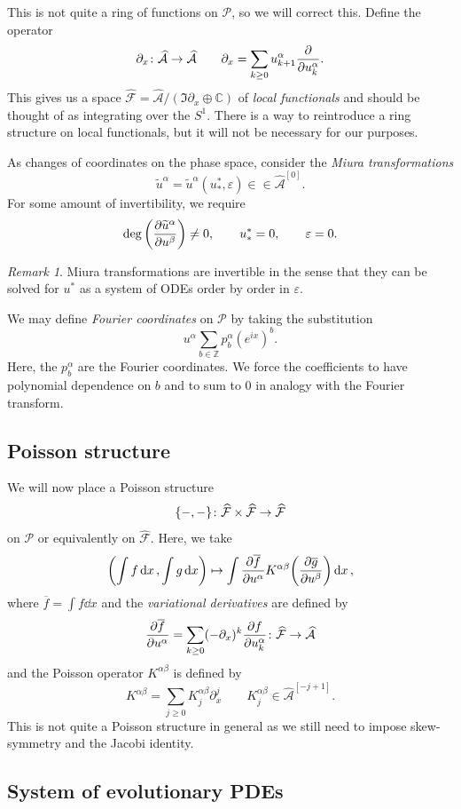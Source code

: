 \documentclass[leqno, openany]{memoir}
\theoremstyle{definition}
\theoremstyle{remark}
\newtheorem{rmk}[thm]{Remark}
\theoremstyle{plain}
\theoremstyle{definition}
\theoremstyle{remark}
\newcommand{\C}{\mathbb{C}}
\newcommand{\Z}{\mathbb{Z}}
\newcommand{\ep}{\varepsilon}
\newcommand{\mc}[1]{\mathcal{#1}}
\newcommand{\ol}[1]{\overline{#1}}
\newcommand{\wt}[1]{\widetilde{#1}}
\newcommand{\wh}[1]{\widehat{#1}}
\begin{document}
This is not quite a ring of functions on $\mc{P}$, so we will correct this. Define the operator
\[ \partial_x \colon \wh{\mc{A}} \to \wh{\mc{A}} \qquad \partial_x = \sum_{k \geq 0} u_{k+1}^{\alpha} \pdv{u_k^{\alpha}}. \]
This gives us a space $\wh{\mc{F}} = \wh{\mc{A}}/(\Im \partial_x \oplus \C)$ of \textit{local functionals} and should be thought of as integrating over the $S^1$. There is a way to reintroduce a ring structure on local functionals, but it will not be necessary for our purposes.

As changes of coordinates on the phase space, consider the \textit{Miura transformations}
\[ \wt{u}^{\alpha} = \wt{u}^{\alpha}(u_*^*, \ep) \in \in \wh{\mc{A}}^{[0]}. \]
For some amount of invertibility, we require
\[ \deg \qty(\pdv{\wt{u}^{\alpha}}{u^{\beta}}) \neq 0, \qquad u_*^* = 0, \qquad \ep = 0. \]

\begin{rmk}
    Miura transformations are invertible in the sense that they can be solved for $u^*$ as a system of ODEs order by order in $\ep$.
\end{rmk}

We may define \textit{Fourier coordinates} on $\mc{P}$ by taking the substitution
\[ u^{\alpha} \sum_{b \in \Z} p_b^{\alpha} (e^{ix})^b. \]
Here, the $p_b^{\alpha}$ are the Fourier coordinates. We force the coefficients to have polynomial dependence on $b$ and to sum to $0$ in analogy with the Fourier transform.

\subsection{Poisson structure}

We will now place a Poisson structure
\[ \qty{-,-} \colon \wh{\mc{F}} \times \wh{\mc{F}} \to \wh{\mc{F}} \]
on $\mc{P}$ or equivalently on $\wh{\mc{F}}$. Here, we take
\[ \qty(\int f \dd{x}, \int g \dd{x}) \mapsto \int \pdv{\ol{f}}{u^{\alpha}} K^{\alpha\beta} \qty(\pdv{\ol{g}}{u^{\beta}}) \dd{x}, \]
where $\ol{f} = \int f \dd{x}$ and the \textit{variational derivatives} are defined by
\[ \pdv{\ol{f}}{u^{\alpha}} = \sum_{k \geq 0} (-\partial_x)^k \pdv{f}{u_k^{\alpha}} \colon \wh{\mc{F}} \to \wh{\mc{A}} \] 
and the Poisson operator $K^{\alpha\beta}$ is defined by
\[ K^{\alpha\beta} = \sum_{j \geq 0} K_j^{\alpha\beta} \partial_x^j \qquad K_j^{\alpha\beta} \in \wh{\mc{A}}^{[-j+1]}. \] 
This is not quite a Poisson structure in general as we still need to impose skew-symmetry and the Jacobi identity.

\subsection{System of evolutionary PDEs}
\end{document}
